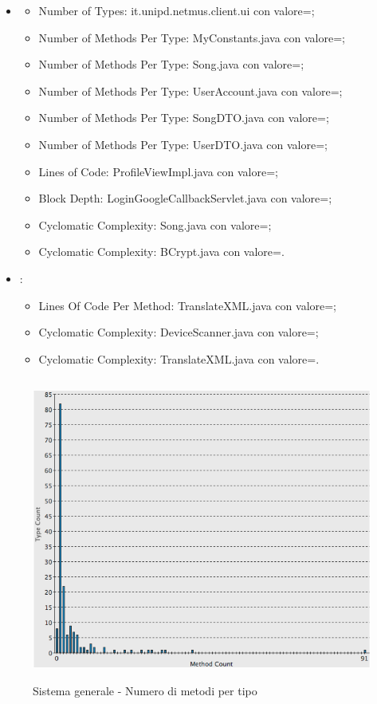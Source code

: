 \begin{itemize}
     \item {}
  \begin{itemize}
  \item Number of Types: it.unipd.netmus.client.ui con valore=;
  \item Number of Methods Per Type: MyConstants.java con valore=;
  \item Number of Methods Per Type: Song.java con valore=;
  \item Number of Methods Per Type: UserAccount.java con valore=;
  \item Number of Methods Per Type: SongDTO.java con valore=;
  \item Number of Methods Per Type: UserDTO.java con valore=;
  \item Lines of Code: ProfileViewImpl.java con valore=;
  \item Block Depth: LoginGoogleCallbackServlet.java con valore=;
  \item Cyclomatic Complexity: Song.java con valore=; 
  \item Cyclomatic Complexity: BCrypt.java con valore=.
  \end{itemize}
    \item {}:
  \begin{itemize}
  \item Lines Of Code Per Method: TranslateXML.java con valore=;
  \item Cyclomatic Complexity: DeviceScanner.java con valore=;
  \item Cyclomatic Complexity: TranslateXML.java con valore=.
  \end{itemize}
\end{itemize}

\begin{figure}[htbp]
  \centering
  \includegraphics[height=10cm]{img/PQ/NumberOfMethodsPerType.png}
\caption{Sistema generale - Numero di metodi per tipo}
\end{figure}

